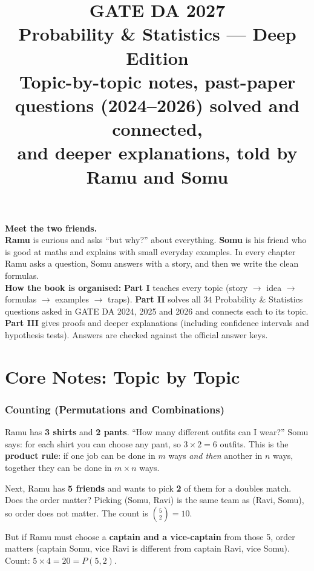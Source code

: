 \documentclass[11pt,a4paper]{article}
\title{\Huge\bfseries GATE DA 2027\\[4pt] \Large Probability \& Statistics --- Deep Edition\\[8pt]
\large Topic-by-topic notes, past-paper questions (2024--2026) solved and connected,\\ and deeper explanations, told by Ramu and Somu}
\author{}
\date{}
\begin{document}
\maketitle
\thispagestyle{empty}

\begin{center}
\begin{tcolorbox}[colback=yellow!10,colframe=orange!80!black,width=0.9\textwidth,breakable]
\textbf{Meet the two friends.}\\
\textbf{Ramu} is curious and asks ``but why?'' about everything. \textbf{Somu} is his friend who is good at maths and explains with small everyday examples. In every chapter Ramu asks a question, Somu answers with a story, and then we write the clean formulas.\\[4pt]
\textbf{How the book is organised:} \textbf{Part I} teaches every topic (story $\rightarrow$ idea $\rightarrow$ formulas $\rightarrow$ examples $\rightarrow$ traps). \textbf{Part II} solves all $34$ Probability \& Statistics questions asked in GATE DA 2024, 2025 and 2026 and connects each to its topic. \textbf{Part III} gives proofs and deeper explanations (including confidence intervals and hypothesis tests). Answers are checked against the official answer keys.
\end{tcolorbox}
\end{center}

\tableofcontents
\newpage

\part{Core Notes: Topic by Topic}
\section{Counting (Permutations and Combinations)}

\begin{story}
Ramu has \textbf{3 shirts} and \textbf{2 pants}. ``How many different outfits can I wear?'' Somu says: for each shirt you can choose any pant, so $3\times 2=6$ outfits. This is the \textbf{product rule}: if one job can be done in $m$ ways \emph{and then} another in $n$ ways, together they can be done in $m\times n$ ways.

Next, Ramu has \textbf{5 friends} and wants to pick \textbf{2} of them for a doubles match. Does the order matter? Picking (Somu, Ravi) is the same team as (Ravi, Somu), so order does not matter. The count is $\binom{5}{2}=10$.

But if Ramu must choose a \textbf{captain and a vice-captain} from those 5, order matters (captain Somu, vice Ravi is different from captain Ravi, vice Somu). Count: $5\times 4=20=P(5,2)$.
\end{story}
\end{document}
